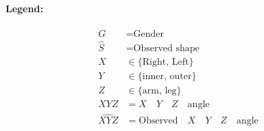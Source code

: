 \documentclass[11pt]{article}
\begin{document}
\begin{question}
{		\paragraph{Legend:}
		\begin{align*}
			G &= \text{Gender} \\
			\hat S &= \text{Observed shape} \\
			X &\in \{\text{Right, Left}\} \\
			Y &\in \{\text{inner, outer}\} \\
			Z &\in \{\text{arm, leg}\} \\
			XYZ &= X \quad Y \quad Z \quad \text{angle} \\
			\widehat {XYZ} &= \text{Observed} \quad X \quad Y \quad Z \quad \text{angle}
		\end{align*}
		}		  
\end{question}
\end{document}
